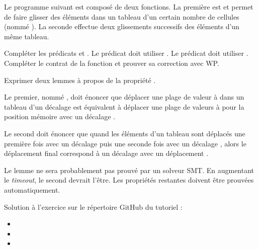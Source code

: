 \label{l4:acsl-properties-lemmas-shift-trans}


Le programme suivant est composé de deux fonctions. La première est
 et permet de faire glisser des éléments dans un tableau
d'un certain nombre de cellules (nommé ). La seconde effectue deux
glissements successifs des éléments d'un même tableau.





Compléter les prédicats  et .
Le prédicat  doit utiliser .
Le prédicat  doit utiliser .
Compléter le contrat de la fonction  et prouver
sa correction avec WP.


Exprimer deux lemmes à propos de la propriété .


Le premier, nommé , doit énoncer que déplacer une plage de
valeur  à  dans un tableau 
d'un décalage  est équivalent à déplacer une plage de valeurs
 à  pour la position mémoire 
avec un décalage .


Le second doit énoncer que quand les éléments d'un tableau sont déplacés une première
fois avec un décalage  puis une seconde fois avec un décalage
, alors le déplacement final correspond à un décalage avec un
déplacement .


Le lemme  ne sera probablement pas prouvé par un solveur SMT.
En augmentant le \textit{timeout}, le second devrait l'être. Les propriétés
restantes doivent être prouvées automatiquement.


\begin{Information}
  Solution à l'exercice sur le répertoire GitHub du tutoriel :
  \begin{itemize}
    \item {}
    \item {}
    \item {}
  \end{itemize}
\end{Information}


